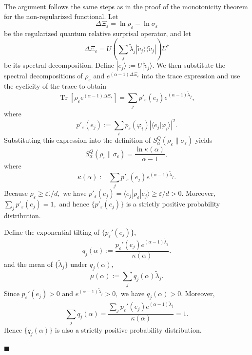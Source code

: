 \documentclass[a4paper, amsfonts, amssymb, amsmath, reprint, showkeys, nofootinbib, twoside, aps, pra]{revtex4-2}
\theoremstyle{definition}
\renewenvironment{proof}{\noindent{\bfseries Proof.}}{\hfill$\blacksquare$}
\begin{document}
\begin{proof}
The argument follows the same steps as in the proof of the monotonicity theorem for the non-regularized functional. Let 
\begin{equation}
    \Delta\Xi_\varepsilon =\ln\rho_\varepsilon -\ln\sigma_\varepsilon
\end{equation}
be the regularized quantum relative surprisal operator, and let
\begin{equation}
\Delta\Xi_\varepsilon=U\left(\sum_j\tilde{\lambda}_j|\tilde v_j\rangle\langle\tilde v_j|\right)U^\dagger
\end{equation}
be its spectral decomposition. 
Define $|e_j\rangle := U|\tilde{v}_j\rangle.$ We then substitute the spectral decompositions of $\rho_\varepsilon$
and $e^{(\alpha-1)\Delta\Xi_\varepsilon}$ into the trace expression and use the cyclicity of the trace to obtain
\begin{equation}
\operatorname{Tr}
\!\left[
\rho_\varepsilon
e^{(\alpha-1)\Delta\Xi_\varepsilon}
\right]
=
\sum_j
p'_\varepsilon(e_j)
e^{(\alpha-1)\tilde{\lambda}_j},
\end{equation}
where
\begin{equation}
p'_\varepsilon(e_j)
:=
\sum_i
p_\varepsilon(\varphi_i)
\left|
\langle e_j|\varphi_i\rangle
\right|^2 .
\end{equation}
Substituting this expression into the definition of
$S_\alpha^Q(\rho_\varepsilon\|\sigma_\varepsilon)$
yields
\begin{equation}
S_\alpha^Q(\rho_\varepsilon\|\sigma_\varepsilon)
=
\frac{\ln\kappa(\alpha)}
{\alpha-1},
\end{equation}
where
\begin{equation}
\kappa(\alpha) :=\sum_j p'_\varepsilon(e_j)e^{(\alpha-1)\tilde{\lambda}_j}.
\end{equation}
Because $\rho_\varepsilon\ge\varepsilon \mathbb{\mathbb{I}}/d,$ we have $ p'_\varepsilon(e_j) = \langle e_j|\rho_\varepsilon|e_j\rangle\ge\varepsilon/d
>0.$ Moreover, $\sum_j p'_\varepsilon(e_j)  = 1,$ and hence $\{p'_\varepsilon(e_j)\}$
is a strictly positive probability distribution.

Define the exponential tilting of $\{p_\varepsilon '(e_j)\}$,
\begin{equation}
q_j(\alpha) := \frac{p_\varepsilon '(e_j)e^{(\alpha -1)\tilde{\lambda}_j}}{\kappa(\alpha)}.
\end{equation}
and the mean of $\{\tilde{\lambda}_j\}$ under $q_j(\alpha)$,
\begin{equation}
\mu(\alpha) := \sum_j q_j(\alpha)\tilde{\lambda}_j.
\end{equation}
Since $p_\varepsilon '(e_j)>0$ and $ e^{(\alpha -1)\tilde{\lambda}_j}>0,$ we have $q_j(\alpha)>0.$
Moreover,
\begin{equation}
\sum_j q_j(\alpha)=\frac{\sum_jp_\varepsilon '(e_j)
e^{(\alpha-1)\tilde{\lambda}_j}}{\kappa(\alpha)}=1.
\end{equation}
Hence $\{q_j(\alpha)\}$ is also a strictly positive probability distribution.



\end{proof}
\end{document}
